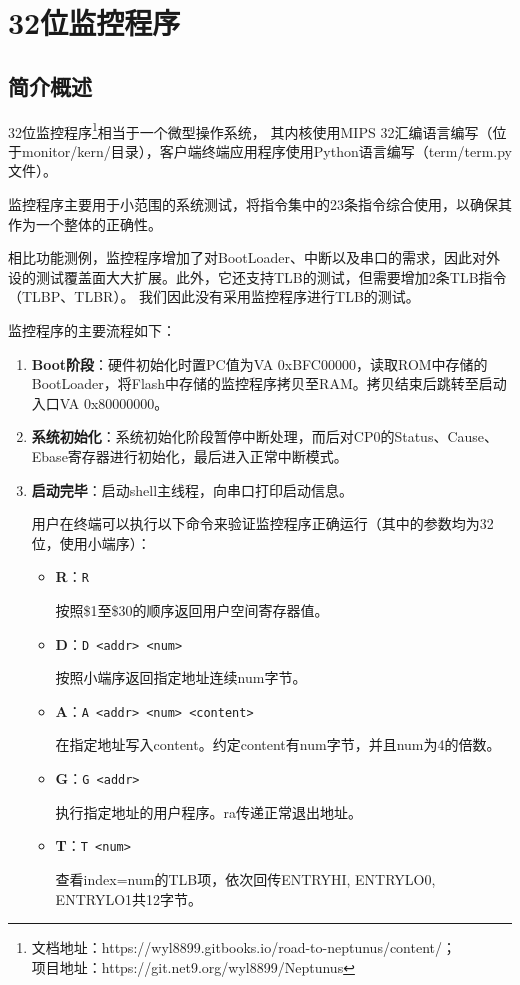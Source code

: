 \chapter{32位监控程序}

\section{简介概述}

32位监控程序\footnote{文档地址：https://wyl8899.gitbooks.io/road-to-neptunus/content/；\\项目地址：https://git.net9.org/wyl8899/Neptunus}相当于一个微型操作系统，
其内核使用MIPS 32汇编语言编写（位于monitor/kern/目录），客户端终端应用程序使用Python语言编写（term/term.py文件）。

监控程序主要用于小范围的系统测试，将指令集中的23条指令综合使用，以确保其作为一个整体的正确性。

相比功能测例，监控程序增加了对BootLoader、中断以及串口的需求，因此对外设的测试覆盖面大大扩展。此外，它还支持TLB的测试，但需要增加2条TLB指令（TLBP、TLBR）。
我们因此没有采用监控程序进行TLB的测试。

监控程序的主要流程如下：

\begin{enumerate}
    \item {\bf Boot阶段}：硬件初始化时置PC值为VA 0xBFC00000，读取ROM中存储的BootLoader，将Flash中存储的监控程序拷贝至RAM。拷贝结束后跳转至启动入口VA 0x80000000。
    \item {\bf 系统初始化}：系统初始化阶段暂停中断处理，而后对CP0的Status、Cause、Ebase寄存器进行初始化，最后进入正常中断模式。
    \item {\bf 启动完毕}：启动shell主线程，向串口打印启动信息。

    用户在终端可以执行以下命令来验证监控程序正确运行（其中的参数均为32位，使用小端序）：
    \begin{itemize}
        \item {\bf R}：\texttt{R}

        按照\$1至\$30的顺序返回用户空间寄存器值。

        \item {\bf D}：\texttt{D <addr> <num>}

        按照小端序返回指定地址连续num字节。

        \item {\bf A}：\texttt{A <addr> <num> <content>}

        在指定地址写入content。约定content有num字节，并且num为4的倍数。

        \item {\bf G}：\texttt{G <addr>}

        执行指定地址的用户程序。ra传递正常退出地址。

        \item {\bf T}：\texttt{T <num>}

        查看index=num的TLB项，依次回传ENTRYHI, ENTRYLO0, ENTRYLO1共12字节。

    \end{itemize}
\end{enumerate}

